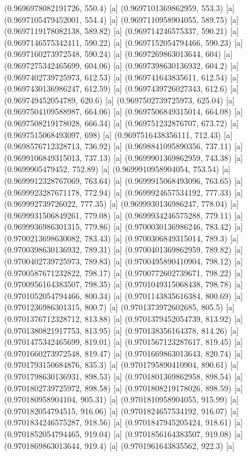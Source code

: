{{{(0.9696978082191726, 550.4) [a] 
(0.9697101369862959, 553.3) [a] 
(0.9697105479452001, 554.4) [a] 
(0.9697110958904055, 589.75) [a] 
(0.9697119178082138, 589.82) [a] 
(0.969714246575337, 590.21) [a] 
(0.9697146575342411, 590.22) [a] 
(0.9697152054794466, 590.23) [a] 
(0.9697160273972548, 590.24) [a] 
(0.9697269863013644, 604) [a] 
(0.9697275342465699, 604.06) [a] 
(0.9697398630136932, 604.2) [a] 
(0.9697402739725973, 612.53) [a] 
(0.969741643835611, 612.54) [a] 
(0.9697430136986247, 612.59) [a] 
(0.9697439726027343, 612.6) [a] 
(0.969749452054789, 620.6) [a] 
(0.9697502739725973, 625.04) [a] 
(0.9697504109588987, 664.06) [a] 
(0.9697506849315014, 664.08) [a] 
(0.9697508219178028, 666.34) [a] 
(0.969751232876707, 673.72) [a] 
(0.9697515068493097, 698) [a] 
(0.9697516438356111, 712.43) [a] 
(0.9698576712328713, 736.92) [a] 
(0.9698841095890356, 737.11) [a] 
(0.9699106849315013, 737.13) [a] 
(0.9699901369862959, 743.38) [a] 
(0.9699905479452, 752.89) [a] 
(0.9699910958904054, 753.54) [a] 
(0.9699912328767069, 763.64) [a] 
(0.9699915068493096, 763.65) [a] 
(0.9699923287671178, 772.94) [a] 
(0.9699924657534192, 777.33) [a] 
(0.969992739726022, 777.35) [a] 
(0.9699930136986247, 778.04) [a] 
(0.9699931506849261, 779.08) [a] 
(0.9699934246575288, 779.11) [a] 
(0.9699936986301315, 779.86) [a] 
(0.9700030136986246, 783.42) [a] 
(0.9700213698630082, 783.43) [a] 
(0.9700306849315014, 789.3) [a] 
(0.9700398630136932, 789.31) [a] 
(0.9700401369862959, 789.82) [a] 
(0.9700402739725973, 789.83) [a] 
(0.9700495890410904, 798.12) [a] 
(0.9700587671232822, 798.17) [a] 
(0.9700772602739671, 798.22) [a] 
(0.9700956164383507, 798.35) [a] 
(0.9701049315068438, 798.78) [a] 
(0.9701052054794466, 800.34) [a] 
(0.9701143835616384, 800.69) [a] 
(0.9701236986301315, 800.7) [a] 
(0.9701373972602685, 805.5) [a] 
(0.9701376712328712, 813.88) [a] 
(0.9701379452054739, 813.92) [a] 
(0.9701380821917753, 813.95) [a] 
(0.970138356164378, 814.26) [a] 
(0.9701475342465699, 819.01) [a] 
(0.9701567123287617, 819.45) [a] 
(0.9701660273972548, 819.47) [a] 
(0.9701669863013643, 820.74) [a] 
(0.9701793150684876, 835.3) [a] 
(0.9701795890410904, 890.61) [a] 
(0.9701798630136931, 898.53) [a] 
(0.9701801369862958, 898.54) [a] 
(0.9701802739725972, 898.58) [a] 
(0.9701808219178026, 898.59) [a] 
(0.970180958904104, 905.31) [a] 
(0.9701810958904055, 915.99) [a] 
(0.970182054794515, 916.06) [a] 
(0.9701824657534192, 916.07) [a] 
(0.9701834246575287, 918.56) [a] 
(0.9701847945205424, 918.61) [a] 
(0.9701852054794465, 919.04) [a] 
(0.9701856164383507, 919.08) [a] 
(0.9701869863013644, 919.4) [a] 
(0.9701961643835562, 922.3) [a] 
}}}
